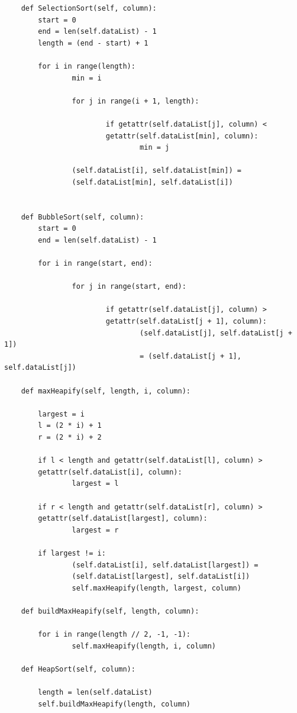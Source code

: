 \documentclass[12pt]{article}
\begin{document}
\begin{verbatim}
    def SelectionSort(self, column):
        start = 0
        end = len(self.dataList) - 1
        length = (end - start) + 1
        
        for i in range(length):
                min = i
                
                for j in range(i + 1, length):
                
                        if getattr(self.dataList[j], column) <
                        getattr(self.dataList[min], column):
                                min = j
                                
                (self.dataList[i], self.dataList[min]) =
                (self.dataList[min], self.dataList[i])


    def BubbleSort(self, column):
        start = 0
        end = len(self.dataList) - 1
    
        for i in range(start, end):
                
                for j in range(start, end):
                
                        if getattr(self.dataList[j], column) >
                        getattr(self.dataList[j + 1], column):
                                (self.dataList[j], self.dataList[j + 1])
                                = (self.dataList[j + 1], self.dataList[j])

    def maxHeapify(self, length, i, column):

        largest = i
        l = (2 * i) + 1
        r = (2 * i) + 2

        if l < length and getattr(self.dataList[l], column) >
        getattr(self.dataList[i], column):
                largest = l

        if r < length and getattr(self.dataList[r], column) >
        getattr(self.dataList[largest], column):
                largest = r

        if largest != i:
                (self.dataList[i], self.dataList[largest]) =
                (self.dataList[largest], self.dataList[i])
                self.maxHeapify(length, largest, column)

    def buildMaxHeapify(self, length, column):

        for i in range(length // 2, -1, -1):
                self.maxHeapify(length, i, column)

    def HeapSort(self, column):

        length = len(self.dataList)
        self.buildMaxHeapify(length, column)


\end{verbatim}
\end{document}
